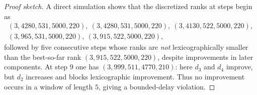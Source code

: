 \documentclass[10pt,a4paper]{amsart}
\begin{document}
\begin{proof}[Proof sketch]
A direct simulation shows that the discretized ranks at steps begin as
\begin{multline}
(3,4280,531,5000,220),\ (3,4280,531,5000,220),\ (3,4130,522,5000,220),\\ \nonumber (3,965,531,5000,220),\ (3,915,522,5000,220),
\end{multline}
followed by five consecutive steps whose ranks are \emph{not} lexicographically smaller than the
best-so-far rank $(3,915,522,5000,220)$, despite improvements in later components.
At step $9$ one has $(3,999,511,4770,210)$: here $d_3$ and $d_4$ improve, but $d_2$ increases and blocks
lexicographic improvement.
Thus no improvement occurs in a window of length $5$, giving a bounded-delay violation.
\end{proof}
\end{document}
